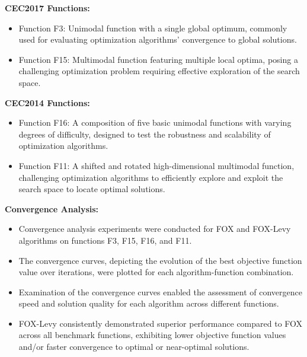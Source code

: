 \documentclass[
]{article}
\begin{document}
\begin{justify}
{\textbf{CEC2017 Functions:}
\begin{itemize}
    \item Function F3: Unimodal function with a single global optimum, commonly used for evaluating optimization algorithms' convergence to global solutions.
\end{itemize}
\begin{itemize}
    \item Function F15: Multimodal function featuring multiple local optima, posing a challenging optimization problem requiring effective exploration of the search space.
\end{itemize}
\textbf{CEC2014 Functions:}
\begin{itemize}
    \item Function F16: A composition of five basic unimodal functions with varying degrees of difficulty, designed to test the robustness and scalability of optimization algorithms.
\end{itemize}
\begin{itemize}
    \item Function F11: A shifted and rotated high-dimensional multimodal function, challenging optimization algorithms to efficiently explore and exploit the search space to locate optimal solutions.
\end{itemize}

\textbf{Convergence Analysis:}

\begin{itemize}
    \item Convergence analysis experiments were conducted for FOX and FOX-Levy algorithms on functions F3, F15, F16, and F11.
\end{itemize}
\begin{itemize}
    \item The convergence curves, depicting the evolution of the best objective function value over iterations, were plotted for each algorithm-function combination.
\end{itemize}
\begin{itemize}
    \item Examination of the convergence curves enabled the assessment of convergence speed and solution quality for each algorithm across different functions.
\end{itemize}
\begin{itemize}
    \item FOX-Levy consistently demonstrated superior performance compared to FOX across all benchmark functions, exhibiting lower objective function values and/or faster convergence to optimal or near-optimal solutions.
\end{itemize}

}
\end{justify}
\end{document}

